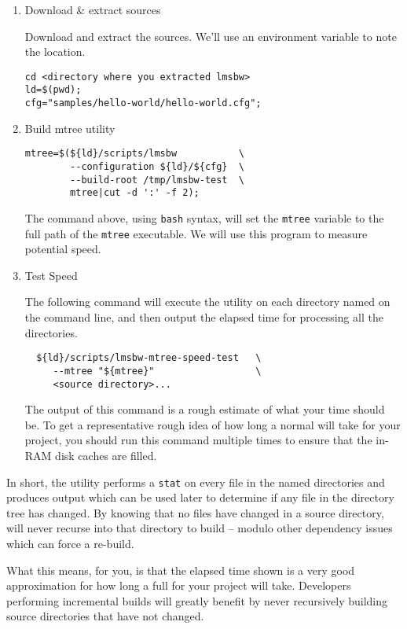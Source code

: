 \begin{enumerate}
\item Download \& extract \lmsbw sources

  Download and extract the sources.  We'll use an environment variable
  to note the location.

\begin{verbatim}
cd <directory where you extracted lmsbw>
ld=$(pwd);
cfg="samples/hello-world/hello-world.cfg";
\end{verbatim}
\item Build mtree utility
\begin{verbatim}
mtree=$(${ld}/scripts/lmsbw           \
        --configuration ${ld}/${cfg}  \
        --build-root /tmp/lmsbw-test  \
        mtree|cut -d ':' -f 2);
\end{verbatim}

The command above, using \texttt{bash} syntax, will set the
\texttt{mtree} variable to the full path of the \texttt{mtree}
executable.  We will use this program to measure potential \nullbuild
speed.

\item Test Speed

  The following command will execute the \mtree utility on each
  directory named on the command line, and then output the elapsed
  time for processing all the directories.

\begin{verbatim}
  ${ld}/scripts/lmsbw-mtree-speed-test   \
     --mtree "${mtree}"                  \
     <source directory>...
\end{verbatim}

The output of this command is a rough estimate of what your \nullbuild
time should be.  To get a representative rough idea of how long a
normal \nullbuild will take for your project, you should run this
command multiple times to ensure that the in-RAM disk caches are
filled.

\end{enumerate}

In short, the \mtree utility performs a \texttt{stat} on every file in
the named directories and produces output which can be used later to
determine if any file in the directory tree has changed.  By knowing
that no files have changed in a source directory, \lmsbw will never
recurse into that directory to build -- modulo other dependency issues
which can force a re-build.

What this means, for you, is that the elapsed time shown is a very
good approximation for how long a full \nullbuild for your project
will take.  Developers performing incremental builds will greatly
benefit by never recursively building source directories that have not
changed.

